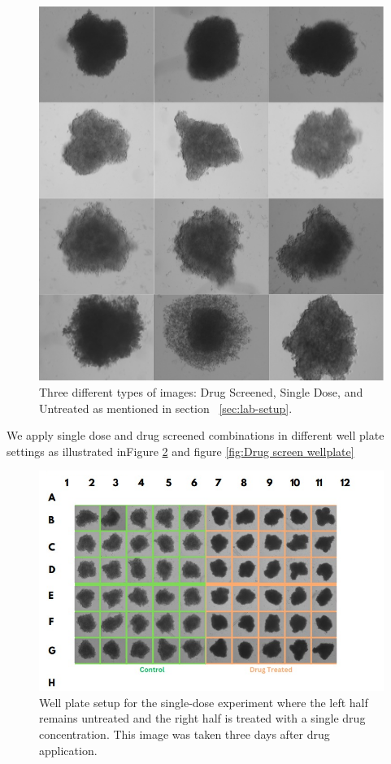 \begin{figure}[H]
  \centering
  \includegraphics[scale=0.6]{figures/types.png} 
  \caption{Three different types of images: Drug Screened, Single Dose, and Untreated as mentioned in section ~\ref{sec:lab-setup}.}
  \label{fig:originals}
\end{figure}

We apply single dose and drug screened combinations in different well plate settings as illustrated inFigure \ref{fig:Single dose wellplate} and figure 
\ref{fig:Drug screen wellplate}  

\begin{figure}[H]
  \centering
  \includegraphics[width=0.9\linewidth]{figures/singledose.png} %
  \caption{Well plate setup for the single-dose experiment where the left half remains untreated and the right half is treated with a single drug 
  concentration. This image was taken three days after drug application.}
  \label{fig:Single dose wellplate}
\end{figure}

